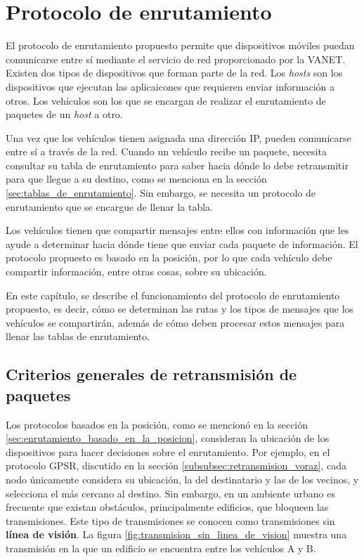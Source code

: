 ﻿%
\chapter{Protocolo de enrutamiento}

\label{ch:protocolo_de_enrutamiento}

El protocolo de enrutamiento propuesto permite que dispositivos móviles puedan
comunicarse entre sí mediante el servicio de red proporcionado por la VANET.
Existen dos tipos de dispositivos que forman parte de la red. Los
\textit{hosts} son los dispositivos que ejecutan las aplicaicones que requieren
enviar información a otros. Los vehículos son los que se encargan de realizar
el enrutamiento de paquetes de un \textit{host} a otro.

Una vez que los vehículos tienen asignada una dirección IP, pueden comunicarse
entre sí a través de la red. Cuando un vehículo recibe un paquete, necesita
consultar su tabla de enrutamiento para saber hacia dónde lo debe retransmitir
para que llegue a su destino, como se menciona en la sección
\ref{sec:tablas_de_enrutamiento}. Sin embargo, se necesita un protocolo de
enrutamiento que se encargue de llenar la tabla.

Los vehículos tienen que compartir mensajes entre ellos con información que les
ayude a determinar hacia dónde tiene que enviar cada paquete de información. El
protocolo propuesto es basado en la posición, por lo que cada vehículo debe
compartir información, entre otras cosas, sobre su ubicación.

En este capítulo, se describe el funcionamiento del protocolo de enrutamiento
propuesto, es decir, cómo se determinan las rutas y los tipos de mensajes que
los vehículos se compartirán, además de cómo deben procesar estos mensajes para
llenar las tablas de enrutamiento.

\section{Criterios generales de retransmisión de paquetes}

\label{sec:criterios_generales_retransmision_paquetes}

Los protocolos basados en la posición, como se mencionó en la sección
\ref{sec:enrutamiento_basado_en_la_posicion}, consideran la ubicación de los
dispositivos para hacer decisiones sobre el enrutamiento. Por ejemplo, en el
protocolo GPSR, discutido en la sección \ref{subsubsec:retransmision_voraz},
cada nodo únicamente considera su ubicación, la del destinatario y las de los
vecinos, y selecciona el más cercano al destino. Sin embargo, en un ambiente
urbano es frecuente que existan obstáculos, principalmente edificios, que
bloqueen las transmisiones. Este tipo de transmisiones se conocen como
transmisiones sin \textbf{línea de visión}. La figura
\ref{fig:transmision_sin_linea_de_vision} muestra una transmisión en la que un
edificio se encuentra entre los vehículos A y B.


